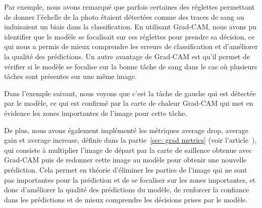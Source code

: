 Par exemple, nous avons remarqué que parfois certaines des réglettes permettant de donner l'échelle de la photo étaient détectées comme des traces de sang ou induisaient un biais dans la classification.
En utilisant Grad-CAM, nous avons pu identifier que le modèle se focalisait sur ces réglettes pour prendre sa décision, ce qui nous a permis de mieux comprendre
les erreurs de classification et d'améliorer la qualité des prédictions.
Un autre avantage de Grad-CAM est qu'il permet de vérifier si le modèle se focalise sur la bonne tâche de sang
dans le cas où plusieurs tâches sont présentes sur une même image.

Dans l'exemple suivant, nous voyons que c'est la tâche de gauche qui est détectée par le modèle, ce qui est confirmé par la carte de chaleur Grad-CAM qui met en évidence les zones importantes de l'image pour cette tâche.


De plus, nous avons également implémenté les métriques average drop, average gain et average increase, définie dans la partie~\ref{sec: grad metrics} (voir l'article~\cite{opticam}), qui consiste à multiplier l'image de départ par la carte de saillence obtenue avec Grad-CAM puis de redonner cette image au modèle
pour obtenir une nouvelle prédiction.
Cela permet en théorie d'éliminer les parties de l'image qui ne sont pas importantes pour la prédiction et de se focaliser sur les zones importantes, et 
donc d'améliorer la qualité des prédictions du modèle, de renforcer la confiance dans les prédictions et de mieux comprendre les décisions prises par le modèle.





